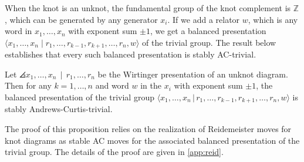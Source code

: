 When the knot is an unknot, the fundamental group of the knot complement is $\mathbb{Z}$, which can be generated by any generator $x_i$. If we add a relator $w$, which is any word in $x_1,\ldots,x_n$ with exponent sum $\pm1$, we get a balanced presentation $\langle x_1,\ldots,x_n\mid r_1,\ldots,r_{k-1},r_{k+1},\ldots,r_n,w\rangle$ of the trivial group. The result below establishes that every such balanced presentation is stably AC-trivial.
\begin{proposition} \label{prop:unknot-stable}
    Let $\angles{ x_1,\ldots, x_n\, \mid \, r_1, \ldots, r_n }$ be the Wirtinger presentation of an unknot diagram. Then for any $k=1,\ldots,n$ and word $w$ in the $x_i$ with exponent sum $\pm 1$, the balanced presentation of the trivial group $\langle x_1,\ldots, x_n\,|\, r_1,\ldots, r_{k-1}, r_{k+1},\ldots, r_n, w\rangle$ is stably Andrews-Curtis-trivial.
\end{proposition}
The proof of this proposition relies on the realization of Reidemeister moves for knot diagrams as stable AC moves for the associated balanced presentation of the trivial group. The details of the proof are given in \autoref{app:reid}.


